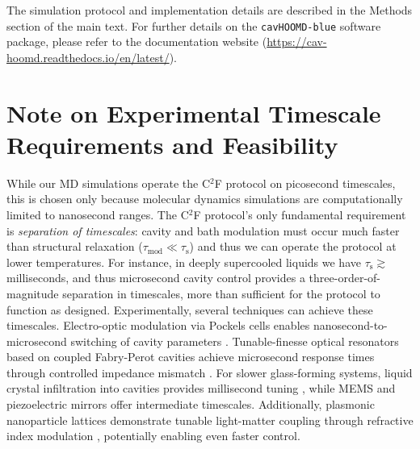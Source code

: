 The simulation protocol and implementation details are described in the Methods section of the main text. For further details on the \texttt{cavHOOMD-blue} software package, please refer to the documentation website (\href{https://cav-hoomd.readthedocs.io/en/latest/}{https://cav-hoomd.readthedocs.io/en/latest/}).

\section{Note on Experimental Timescale Requirements and Feasibility}
\label{sec:experimental_feasibility}
While our MD simulations operate the C$^2$F protocol on picosecond timescales, this is chosen only because molecular dynamics simulations are computationally limited to nanosecond ranges. The C$^2$F protocol's only fundamental requirement is \emph{separation of timescales}: cavity and bath modulation must occur much faster than structural relaxation ($\tau_\mathrm{mod} \ll \tau_\mathrm{s}$) and thus we can operate the protocol at lower temperatures. For instance, in deeply supercooled liquids we have $\tau_\mathrm{s} \gtrsim$ milliseconds, and thus microsecond cavity control provides a three-order-of-magnitude separation in timescales, more than sufficient for the protocol to function as designed.
Experimentally, several techniques can achieve these timescales. Electro-optic modulation via Pockels cells enables nanosecond-to-microsecond switching of cavity parameters \cite{dutta2017alloptical,gryaznov2019active}. Tunable-finesse optical resonators based on coupled Fabry-Perot cavities achieve microsecond response times through controlled impedance mismatch \cite{stone2020optical}. For slower glass-forming systems, liquid crystal infiltration into cavities provides millisecond tuning \cite{yavorskiy2025terahertz}, while MEMS and piezoelectric mirrors offer intermediate timescales. Additionally, plasmonic nanoparticle lattices demonstrate tunable light-matter coupling through refractive index modulation \cite{wang2019manipulating}, potentially enabling even faster control.

